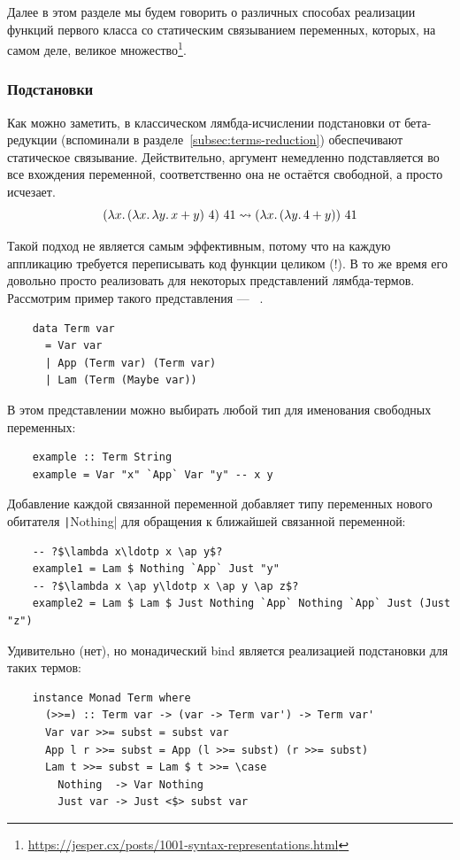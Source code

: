 Далее в этом разделе мы будем говорить о различных способах реализации функций первого класса со статическим связыванием переменных, которых, на самом деле, великое множество\footnote{\url{https://jesper.cx/posts/1001-syntax-representations.html}}.

\subsubsection{Подстановки} \label{subsubsec:substitutions}

Как можно заметить, в классическом лямбда-исчислении подстановки от бета-редукции (вспоминали в разделе~\ref{subsec:terms-reduction}) обеспечивают статическое связывание.
Действительно, аргумент немедленно подставляется во все вхождения переменной, соответственно она не остаётся свободной, а просто исчезает.
\[
    (\lambda x\ldotp (\lambda x\ldotp \lambda y\ldotp x + y) ~ 4) ~ 41 \rightsquigarrow (\lambda x\ldotp (\lambda y\ldotp 4 + y)) ~ 41
\]

Такой подход не является самым эффективным, потому что на каждую аппликацию требуется переписывать код функции целиком (!).
В то же время его довольно просто реализовать для некоторых представлений лямбда-термов.
Рассмотрим пример такого представления --- ~\cite{chargueraud2012locally}.

\begin{verbatim}
    data Term var
      = Var var
      | App (Term var) (Term var)
      | Lam (Term (Maybe var))
\end{verbatim}

В этом представлении можно выбирать любой тип для именования свободных переменных:
\begin{verbatim}
    example :: Term String
    example = Var "x" `App` Var "y" -- x y
\end{verbatim}
Добавление каждой связанной переменной добавляет типу переменных нового обитателя \texttt|Nothing| для обращения к ближайшей связанной переменной:
\begin{verbatim}
    -- ?$\lambda x\ldotp x \ap y$?
    example1 = Lam $ Nothing `App` Just "y"
    -- ?$\lambda x \ap y\ldotp x \ap y \ap z$?
    example2 = Lam $ Lam $ Just Nothing `App` Nothing `App` Just (Just "z")
\end{verbatim}

Удивительно (нет), но монадический bind является реализацией подстановки для таких термов:

\begin{verbatim}
    instance Monad Term where
      (>>=) :: Term var -> (var -> Term var') -> Term var'
      Var var >>= subst = subst var
      App l r >>= subst = App (l >>= subst) (r >>= subst)
      Lam t >>= subst = Lam $ t >>= \case
        Nothing  -> Var Nothing
        Just var -> Just <$> subst var
\end{verbatim}

